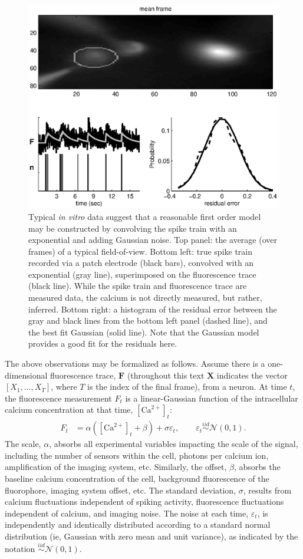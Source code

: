 \documentclass{article}
\providecommand{\ve}[1]{\boldsymbol{#1}}
\newcommand{\Ca}{[\text{Ca}^{2+}]}
\newcommand{\bF}{\ve{F}}
\newcommand{\bX}{\ve{X}}
\newcommand{\mN}{\mathcal{N}}
\newcommand{\sig}{\sigma}
\begin{document}
\begin{figure}[h!]
\centering \includegraphics[width=.9\linewidth]{in_vitro_ex}
\caption[data-based model]{Typical \emph{in vitro} data suggest that a reasonable first order model may be constructed by convolving the spike train with an exponential and adding Gaussian noise. Top panel: the average (over frames) of a typical field-of-view.  Bottom left: true spike train recorded via a patch electrode (black bars), convolved with an exponential (gray line), superimposed on the fluorescence trace (black line).  While the spike train and fluorescence trace are measured data, the calcium is not directly measured, but rather, inferred.  Bottom right: a histogram of the residual error between the gray and black lines from the bottom left panel (dashed line), and the best fit Gaussian (solid line). Note that the Gaussian model provides a good fit for the residuals here.} \label{fig:in_vitro_ex}
\end{figure}

The above observations may be formalized as follows. Assume there is a one-dimensional fluorescence trace, $\bF$ (throughout this text $\bX$ indicates the vector $[X_1, \ldots, X_T]$, where $T$ is the index of the final frame), from a neuron.  At time $t$, the fluorescence measurement $F_t$ is a linear-Gaussian function of the intracellular calcium concentration at that time, $\Ca_t$:
\begin{align} \label{eq:F}
F_t &= \alpha (\Ca_t + \beta) + \sig \varepsilon_t, \qquad \varepsilon_t \overset{iid}{\sim} \mN(0,1).
\end{align}
\noindent The scale, $\alpha$, absorbs all experimental variables impacting the scale of the signal, including the number of sensors within the cell, photons per calcium ion, amplification of the imaging system, etc.  Similarly, the offset, $\beta$, absorbs the baseline calcium concentration of the cell, background fluorescence of the fluorophore, imaging system offset, etc.  The standard deviation, $\sig$, results from calcium fluctuations independent of spiking activity, fluorescence fluctuations independent of calcium, and imaging noise. The noise at each time, $\varepsilon_t$, is independently and identically distributed according to a standard normal distribution (ie, Gaussian with zero mean and unit variance), as indicated by the notation $\overset{iid}{\sim}\mN(0,1)$. 
\end{document}
